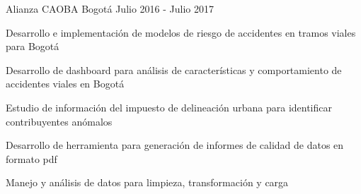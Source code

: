 \begin{cventries}
  {Alianza CAOBA} %
  {Bogotá} %
  {Julio 2016 - Julio 2017} %
  {
    \begin{cvitems}
    \item{Desarrollo e implementación de modelos de riesgo de accidentes en tramos viales para Bogotá}
    \item{Desarrollo de dashboard para análisis de características y comportamiento de accidentes viales en Bogotá}
    \item{Estudio de información del impuesto de delineación urbana para identificar contribuyentes anómalos}
    \item{Desarrollo de herramienta para generación de informes de calidad de datos en formato pdf}
    \item{Manejo y análisis de datos para limpieza, transformación y carga}
    \end{cvitems}
  } %

\end{cventries}
